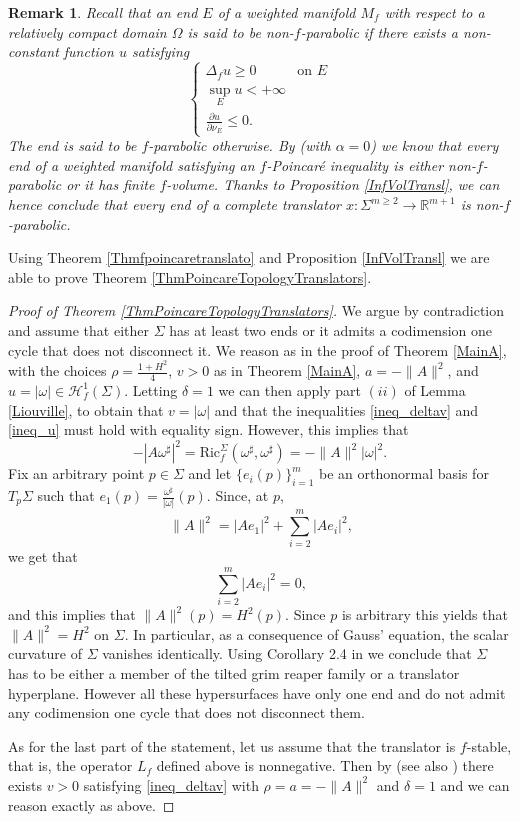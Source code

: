 \documentclass[11pt, leqno]{amsart}
\newtheorem{remark}[theorem]{Remark}
\begin{document}
\begin{remark}\label{RmkEndsNonfPar}
\rm{Recall that an end $E$ of a weighted manifold $M_f$ with respect to a relatively compact domain $\Omega$ is said to be non-$f$-parabolic if there exists a non-constant function $u$ satisfying
\[
\begin{cases}
\Delta_f u\geq 0 & \textrm{on }E\\
\sup_E u<+\infty\\
\frac{\partial u}{\partial \nu_E}\leq 0.
\end{cases}
\]
The end is said to be $f$-parabolic otherwise. By \cite[Lemma 1]{IR_fMin}\label{f-CSZ} (with $\alpha=0$) we know that every end of a weighted manifold satisfying an $f$-Poincar\'e inequality is either non-$f$-parabolic or it has finite $f$-volume. Thanks to Proposition \ref{InfVolTransl}, we can hence conclude that every end of a complete translator  $x:\Sigma^{m\geq 2}\to\mathbb{R}^{m+1}$ is non-$f$-parabolic.}
\end{remark}

Using Theorem \ref{Thmfpoincaretranslato} and Proposition \ref{InfVolTransl} we are able to prove Theorem \ref{ThmPoincareTopologyTranslators}.

\begin{proof}[Proof of Theorem \ref{ThmPoincareTopologyTranslators}]
We argue by contradiction and assume that either $\Sigma$ has at least two ends or it admits a codimension one cycle that does not disconnect it. We reason as in the proof of Theorem \ref{MainA}, with the choices $\rho=\frac{1+H^2}{4}$, $v>0$ as in Theorem \ref{MainA}, $a=-\|A\|^2$, and $u=|\omega|\in\mathcal{H}^1_f(\Sigma)$. Letting $\delta=1$ we can then apply part $(ii)$ of Lemma \ref{Liouville}, to obtain that $v=|\omega|$ and that the inequalities \eqref{ineq_deltav} and \eqref{ineq_u} must hold with equality sign. However, this implies that
\[
-|A\omega^\sharp|^2=\mathrm{Ric}^\Sigma_f(\omega^\sharp,\omega^\sharp)=-\|A\|^2|\omega|^2.
\]
Fix an arbitrary point $p\in \Sigma$ and let $\{e_{i}(p)\}_{i=1}^{m}$ be an orthonormal basis for $T_{p}\Sigma$ such that $e_{1}(p)=\frac{\omega^\sharp}{|\omega|}(p)$. Since, at $p$, 
\[
\ \|A\|^2=|Ae_1|^2+\sum_{i=2}^{m}|Ae_{i}|^2,
\]
we get that
\[
\ \sum_{i=2}^{m}|Ae_{i}|^2=0,
\]
and this implies that $\|A\|^2(p)=H^2(p)$. Since $p$ is arbitrary this yields that $\|A\|^2=H^2$ on $\Sigma$. In particular, as a consequence of Gauss' equation, the scalar curvature of $\Sigma$ vanishes identically. Using Corollary 2.4 in \cite{MSHS} we conclude that $\Sigma$ has to be either a member of the tilted grim reaper family or a translator hyperplane. However all these hypersurfaces have only one end and do not admit any codimension one cycle that does not disconnect them.

As for the last part of the statement, let us assume that the translator is $f$-stable, that is, the operator $L_{f}$ defined above is nonnegative. Then by \cite{FCS} (see also \cite{IR_fMin}) there exists $v>0$ satisfying \eqref{ineq_deltav} with $\rho=a=-\|A\|^2$ and $\delta=1$ and we can reason exactly as above.
\end{proof}
\end{document}
